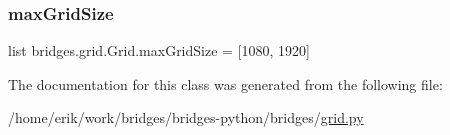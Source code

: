 \subsubsection{\texorpdfstring{max\+Grid\+Size}{maxGridSize}}
{\footnotesize\ttfamily list bridges.\+grid.\+Grid.\+max\+Grid\+Size = \mbox{[}1080, 1920\mbox{]}\hspace{0.3cm}{\ttfamily [static]}}



The documentation for this class was generated from the following file\+:\begin{DoxyCompactItemize}
\item 
/home/erik/work/bridges/bridges-\/python/bridges/\hyperlink{grid_8py}{grid.\+py}\end{DoxyCompactItemize}
